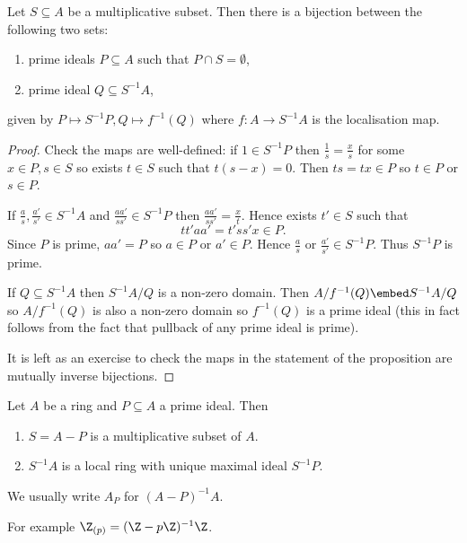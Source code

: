\documentclass[a4paper]{article}
\begin{document}
\begin{proposition}
  Let \(S \subseteq A\) be a multiplicative subset. Then there is a bijection between the following two sets:
  \begin{enumerate}
  \item prime ideals \(P \subseteq A\) such that \(P \cap S = \emptyset\),
  \item prime ideal \(Q \subseteq S^{-1}A\),
  \end{enumerate}
  given by \(P \mapsto S^{-1}P, Q \mapsto f^{-1}(Q)\) where \(f: A \to S^{-1}A\) is the localisation map.
\end{proposition}

\begin{proof}
  Check the maps are well-defined: if \(1 \in S^{-1}P\) then \(\frac{1}{s} = \frac{x}{s}\) for some \(x \in P, s \in S\) so exists \(t \in S\) such that \(t(s - x) = 0\). Then \(ts = tx \in P\) so \(t \in P\) or \(s \in P\).

  If \(\frac{a}{s}, \frac{a'}{s'} \in S^{-1}A\) and \(\frac{aa'}{ss'} \in S^{-1}P\) then \(\frac{aa'}{ss'} = \frac{x}{t}\). Hence exists \(t' \in S\) such that
  \[
    tt' aa' = t'ss'x \in P.
  \]
  Since \(P\) is prime, \(aa' = P\) so \(a \in P\) or \(a' \in P\). Hence \(\frac{a}{s}\) or \(\frac{a'}{s'} \in S^{-1}P\). Thus \(S^{-1}P\) is prime.

  If \(Q \subseteq S^{-1}A\) then \(S^{-1}A/Q\) is a non-zero domain. Then \(A/f^{-1}(Q) \embed S^{-1}A/Q\) so \(A/f^{-1}(Q)\) is also a non-zero domain so \(f^{-1}(Q)\) is a prime ideal (this in fact follows from the fact that pullback of any prime ideal is prime).

  It is left as an exercise to check the maps in the statement of the proposition are mutually inverse bijections.
\end{proof}

\begin{corollary}
  Let \(A\) be a ring and \(P \subseteq A\) a prime ideal. Then
  \begin{enumerate}
  \item \(S = A - P\) is a multiplicative subset of \(A\).
  \item \(S^{-1}A\) is a local ring with unique maximal ideal \(S^{-1} P\).
  \end{enumerate}
  We usually write \(A_P\) for \((A - P)^{-1}A\).
\end{corollary}

For example \(\Z_{(p)} = (\Z - p\Z)^{-1}\Z\).
\end{document}
